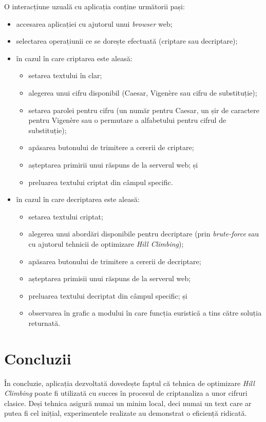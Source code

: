 \documentclass{article}
\begin{document}
O interacțiune uzuală cu aplicația conține următorii pași:
\begin{itemize}
    \item accesarea aplicației cu ajutorul unui \textit{browser} web;
    \item selectarea operațiunii ce se dorește efectuată (criptare sau decriptare);
    \item în cazul în care criptarea este aleasă: 
        \begin{itemize}
            \item setarea textului în clar;
            \item alegerea unui cifru disponibil (Caesar, Vigenère sau cifru de substituție);
            \item setarea parolei pentru cifru (un număr pentru Caesar, un șir de caractere pentru Vigenère sau o permutare a alfabetului pentru cifrul de substituție);
            \item apăsarea butonului de trimitere a cererii de criptare;
            \item așteptarea primirii unui răspuns de la serverul web; și
            \item preluarea textului criptat din câmpul specific.
        \end{itemize}
    \item în cazul în care decriptarea este aleasă: 
        \begin{itemize}
            \item setarea textului criptat;
            \item alegerea unui abordări disponibile pentru decriptare (prin \textit{brute-force} sau cu ajutorul tehnicii de optimizare \textit{Hill Climbing});
            \item apăsarea butonului de trimitere a cererii de decriptare;
            \item așteptarea primisii unui răspuns de la serverul web;
            \item preluarea textului decriptat din câmpul specific; și
            \item observarea în grafic a modului în care funcția euristică a tins către soluția returnată.
        \end{itemize}
\end{itemize}

\section{Concluzii}

În concluzie, aplicația dezvoltată dovedește faptul că tehnica de optimizare \textit{Hill Climbing} poate fi utilizată cu succes în procesul de criptanaliza a unor cifruri clasice. Deși tehnica asigură numai un minim local, deci numai un text care ar putea fi cel inițial, experimentele realizate au demonstrat o eficiență ridicată.
\end{document}
